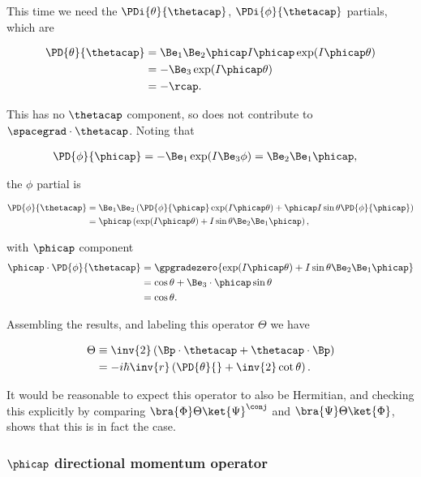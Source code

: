 This time we need the $\PDi{\theta}{\thetacap}$, $\PDi{\phi}{\thetacap}$ partials, which are

\begin{align*}
\PD{\theta}{\thetacap} 
&=
\Be_1 \Be_2 \phicap I \phicap \exp( I \phicap \theta) \\
&=
-\Be_3 \exp( I \phicap \theta) \\
&=
- \rcap.
\end{align*}

This has no $\thetacap$ component, so does not contribute to $\spacegrad \cdot \thetacap$.  Noting that

\begin{align*}
\PD{\phi}{\phicap} &= -\Be_1 \exp( I \Be_3 \phi ) = \Be_2 \Be_1 \phicap,
\end{align*}

the $\phi$ partial is

\begin{align*}
\PD{\phi}{\thetacap} &=
\Be_1 \Be_2 \left( 
\PD{\phi}{\phicap} \exp( I \phicap \theta )
+\phicap I \sin\theta \PD{\phi}{\phicap} 
\right) \\
&=
\phicap 
\left( 
\exp( I \phicap \theta )
+I \sin\theta \Be_2 \Be_1 \phicap
\right),
\end{align*}

with $\phicap$ component
\begin{align*}
\phicap \cdot \PD{\phi}{\thetacap} &=
\gpgradezero{
\exp( I \phicap \theta )
+I \sin\theta \Be_2 \Be_1 \phicap } \\
&=
\cos\theta + \Be_3 \cdot \phicap \sin\theta \\
&=
\cos\theta.
\end{align*}

Assembling the results, and labeling this operator $\Theta$ we have

\begin{align*}
\Theta &\equiv \inv{2} \left( \Bp \cdot \thetacap + \thetacap \cdot \Bp \right)  \\
&=
-i \hbar \inv{r} \left( \PD{\theta}{} + \inv{2} \cot\theta \right).
\end{align*}

It would be reasonable to expect this operator to also be Hermitian, and checking this explicitly by comparing
$\bra{\Phi} \Theta \ket{\Psi}^\conj$ and $\bra{\Psi} \Theta \ket{\Phi}$, shows that this is in fact the case.

\subsubsection{$\phicap$ directional momentum operator}

